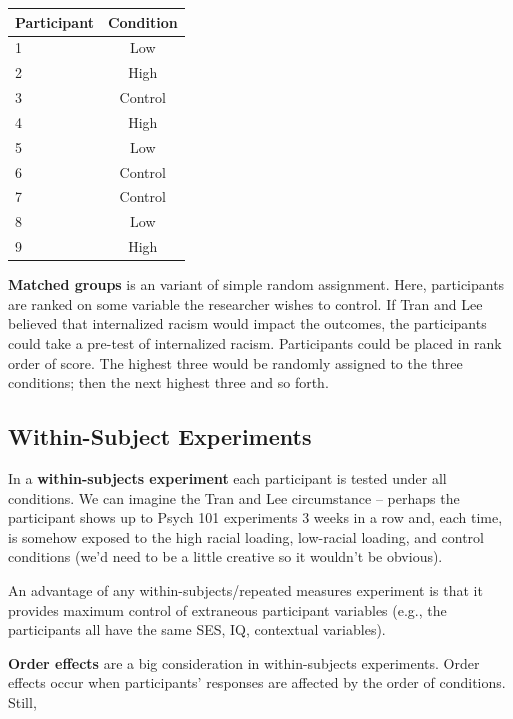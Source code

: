 \documentclass[
  english,
]{book}
\begin{document}
\begin{longtable}[]{@{}lc@{}}
\toprule
Participant & Condition \\
\midrule
\endhead
1 & Low \\
2 & High \\
3 & Control \\
4 & High \\
5 & Low \\
6 & Control \\
7 & Control \\
8 & Low \\
9 & High \\
\bottomrule
\end{longtable}

\textbf{Matched groups} is an variant of simple random assignment. Here, participants are ranked on some variable the researcher wishes to control. If Tran and Lee believed that internalized racism would impact the outcomes, the participants could take a pre-test of internalized racism. Participants could be placed in rank order of score. The highest three would be randomly assigned to the three conditions; then the next highest three and so forth.

\hypertarget{within-subject-experiments}{%
\subsection{Within-Subject Experiments}\label{within-subject-experiments}}

In a \textbf{within-subjects experiment} each participant is tested under all conditions. We can imagine the Tran and Lee \citeyearpar{tran_you_2014} circumstance -- perhaps the participant shows up to Psych 101 experiments 3 weeks in a row and, each time, is somehow exposed to the high racial loading, low-racial loading, and control conditions (we'd need to be a little creative so it wouldn't be obvious).

An advantage of any within-subjects/repeated measures experiment is that it provides maximum control of extraneous participant variables (e.g., the participants all have the same SES, IQ, contextual variables).

\textbf{Order effects} are a big consideration in within-subjects experiments. Order effects occur when participants' responses are affected by the order of conditions. Still,
\end{document}
